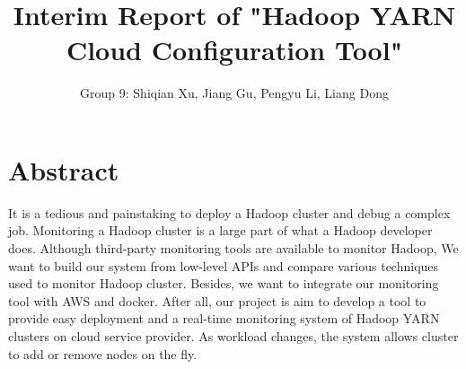 \documentclass{article}
\title{Interim Report of "Hadoop YARN Cloud Configuration Tool"}
\author{Group 9: Shiqian Xu, Jiang Gu, Pengyu Li, Liang Dong}
\date{}
\begin{document}
\maketitle

\section{Abstract}
 It is a tedious and painstaking to deploy a Hadoop cluster and debug a complex job.  Monitoring a Hadoop cluster is a large part of what a Hadoop developer does. Although third-party monitoring tools are available to monitor Hadoop,  We want to build our system from low-level APIs and compare various techniques used to monitor Hadoop cluster. Besides, we want to integrate our monitoring tool with AWS and docker. After all,  our project is aim to develop a tool to provide easy deployment and a real-time monitoring system of Hadoop YARN clusters on  cloud service provider. As workload changes, the system allows cluster to add or remove nodes on the fly. 		
\end{document}
